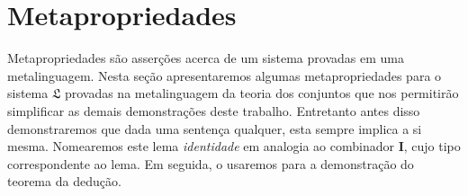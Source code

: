 \section{Metapropriedades}
    Metapropriedades são asserções acerca de um sistema provadas em uma metalinguagem.
    Nesta seção apresentaremos algumas metapropriedades para o sistema $\mathfrak{L}$ provadas na metalinguagem da teoria dos conjuntos que nos permitirão simplificar as demais demonstrações deste trabalho.
    Entretanto antes disso demonstraremos que dada uma sentença qualquer, esta sempre implica a si mesma.
    Nomearemos este lema \emph{identidade} em analogia ao combinador $\mathbf{I}$, cujo tipo correspondente ao lema.
    Em seguida, o usaremos para a demonstração do teorema da dedução.

    \vspace{.5\baselineskip}
